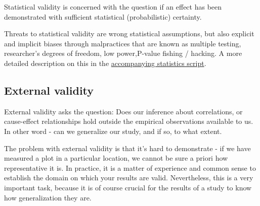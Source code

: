 \documentclass{tufte-book}
\begin{document}
Statistical validity is concerned with the question if an effect has been demonstrated with sufficient statistical (probabilistic) certainty. 

Threats to statistical validity are wrong statistical assumptions, but also explicit and implicit biases through malpractices that are known as multiple testing, researcher’s degrees of freedom, low power,P-value fishing / hacking. A more detailed description on this in the \href{https://github.com/florianhartig/ResearchSkills/raw/master/Labs/Statistics/Script/EssentialStatistics.pdf}{accompanying statistics script}. 

\subsection{External validity}

External validity asks the question: Does our inference about correlations, or cause-effect relationships hold outside the empirical observations available to us. In other word - can we generalize our study, and if so, to what extent. 

The problem with external validity is that it's hard to demonstrate - if we have measured a plot in a particular location, we cannot be sure a priori how representative it is. In practice, it is a matter of experience and common sense to establish the domain on which your results are valid. Nevertheless, this is a very important task, because it is of course crucial for the results of a study to know how generalization they are. 

\vspace{1cm}
\end{document}
